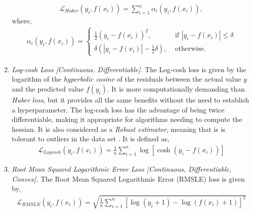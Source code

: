\documentclass{article}
\begin{document}
\begin{enumerate}
\begin{equation}
      \begin{split}
        \mathcal{L}_{Huber}(y_i, f(x_i)) = \sum^{n}_{i=1} \alpha_i(y_i, f(x_i)),
      \end{split}
    \end{equation}
    where, 
    \begin{equation*}
      \begin{split}
        \alpha_i(y_i, f(x_i)) =\begin{cases}
          \frac{1}{2} (y_i-f(x_i))^2, &\text{ if } |y_i -f(x_i) | \leq \delta \\  
          \delta\left( |y_i -f(x_i)| -\frac{1}{2}\delta \right), &\text{ otherwise.} 
        \end{cases}
      \end{split}
    \end{equation*}
    \item \textit{Log-cosh Loss [Continuous, Differentiable].} The Log-cosh loss is given by the logarithm of the \textit{hyperbolic cosine} of the residuals between the actual value $y$ and the predicted value $f(y_i)$. It is more computationally demanding than \textit{Huber loss}, but it provides all the same benefits without the need to establish a hyperparameter. The log-cosh loss has the advantage of being twice differentiable, making it appropriate for algorithms needing to compute the hessian. It is also considered as a \textit{Robust estimator}, meaning that is is tolerant to outliers in the data set \citep{ciampiconi2023survey}. It is defined as, 
  \begin{equation}
      \begin{split}
        \mathcal{L}_{Logcosh}(y_i, f(x_i)) = \frac{1}{n} \sum^{n}_{i=1} \log[\cosh(y_i-f(x_i))]
      \end{split}
    \end{equation}
    \item \textit{Root Mean Squared Logarithmic Error Loss [Continuous, Differentiable, Convex].} The Root Mean Squared Logarithmic Error (RMSLE) loss is given by,
\begin{equation}
      \begin{split}
        \mathcal{L}_{RMSLE}(y_i, f(x_i)) = \sqrt{\frac{1}{n} \sum^{n}_{i=1} [\log (y_i + 1) - \log(f(x_i)+1)]^2 }
      \end{split}
    \end{equation}


\end{enumerate}
\end{document}
